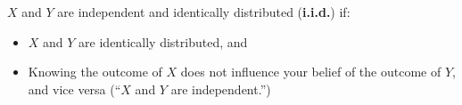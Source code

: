 \documentclass[openany]{book}
\begin{document}
\begin{defn}[i.i.d]
	$X$ and $Y$ are independent and identically distributed (\textbf{i.i.d.}) if:
	\begin{itemize}
		\item $X$ and $Y$ are identically distributed, and
		\item Knowing the outcome of $X$ does not influence your belief of the outcome of $Y$, and vice versa (“$X$ and $Y$ are independent.”)
	\end{itemize}
\end{defn}
\end{document}
